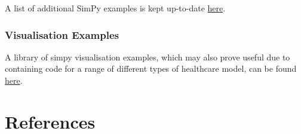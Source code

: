 \documentclass[
  letterpaper,
  DIV=11,
  numbers=noendperiod]{scrreprt}
\newlength{\cslhangindent}
\newenvironment{CSLReferences}[2] %
 {\begin{list}{}{%
  \setlength{\itemindent}{0pt}
  \setlength{\leftmargin}{0pt}
  \setlength{\parsep}{0pt}
  \ifodd #1
   \setlength{\leftmargin}{\cslhangindent}
   \setlength{\itemindent}{-1\cslhangindent}
  \fi
  \setlength{\itemsep}{#2\baselineskip}}}
 {\end{list}}
\begin{document}
A list of additional SimPy examples is kept up-to-date
\href{https://github.com/stars/Bergam0t/lists/simpy-examples}{here}.

\subsection{Visualisation Examples}\label{visualisation-examples}

A library of simpy visualisation examples, which may also prove useful
due to containing code for a range of different types of healthcare
model, can be found
\href{https://github.com/Bergam0t/simpy_visualisation}{here}.


\chapter*{References}\label{references}


\label{refs}
\begin{CSLReferences}{0}{1}
\end{CSLReferences}
\end{document}
